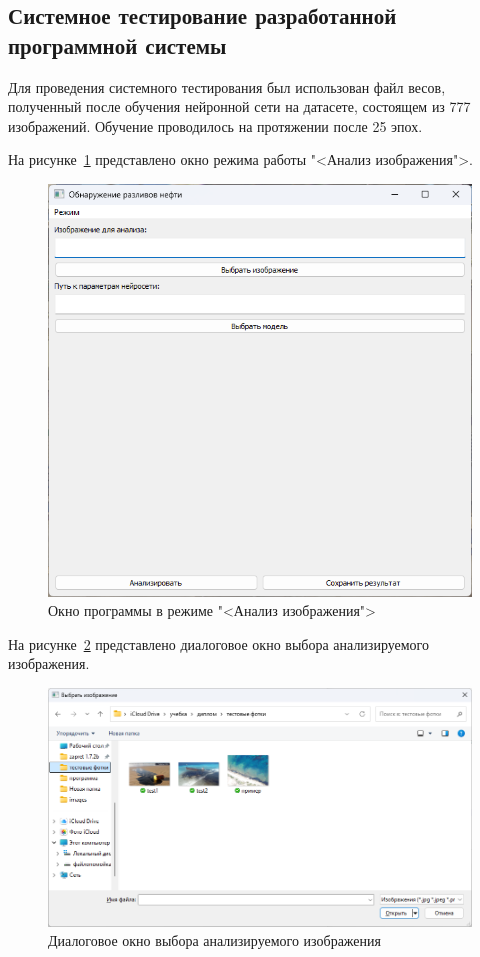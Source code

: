 \subsection{Системное тестирование разработанной программной системы}

Для проведения системного тестирования был использован файл весов, полученный после обучения нейронной сети на датасете, состоящем из 777 изображений. Обучение проводилось на протяжении после 25 эпох.

На рисунке~\ref{fig:ui_analysis_mode} представлено окно режима работы "<Анализ изображения">.
\begin{figure}[H]
	\centering
	\includegraphics[width=0.7\linewidth]{"images/анализ окно"}
	\caption{Окно программы в режиме "<Анализ изображения">}
	\label{fig:ui_analysis_mode}
\end{figure}

На рисунке~\ref{fig:analyze_select_image} представлено диалоговое окно выбора анализируемого изображения.

\begin{figure}[H]
	\centering
	\includegraphics[width=0.7\linewidth]{"images/выбор анализируемого изображения"}
	\caption{Диалоговое окно выбора анализируемого изображения}
	\label{fig:analyze_select_image}
\end{figure}

